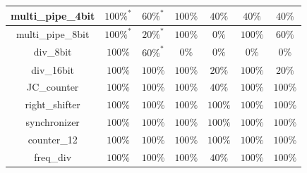\begin{tabular}{c|cc|cc|cc}
multi\_pipe\_4bit & \color{black} {\cellcolor{lightblue}} $100\%^*$ & \color{black} {\cellcolor{lightgreen}} $60\%^*$ & \color{black} {\cellcolor{lightblue}} $100\%$ & $40\%$ & $40\%$ & $40\%$ \\ \midrule
multi\_pipe\_8bit & \color{black} {\cellcolor{lightblue}} $100\%^*$ & $20\%^*$ & \color{black} {\cellcolor{lightblue}} $100\%$ & $0\%$ & \color{black} {\cellcolor{lightblue}} $100\%$ & \color{black} {\cellcolor{lightgreen}} $60\%$ \\ \midrule
div\_8bit & \color{black} {\cellcolor{lightblue}} $100\%$ & \color{black} {\cellcolor{lightgreen}} $60\%^*$ & $0\%$ & $0\%$ & $0\%$ & $0\%$ \\ \midrule
div\_16bit & \color{black} {\cellcolor{lightblue}} $100\%$ & \color{black} {\cellcolor{lightgreen}} $100\%$ & \color{black} {\cellcolor{lightblue}} $100\%$ & $20\%$ & \color{black} {\cellcolor{lightblue}} $100\%$ & $20\%$ \\ \midrule
JC\_counter & \color{black} {\cellcolor{lightblue}} $100\%$ & \color{black} {\cellcolor{lightgreen}} $100\%$ & \color{black} {\cellcolor{lightblue}} $100\%$ & $40\%$ & \color{black} {\cellcolor{lightblue}} $100\%$ & \color{black} {\cellcolor{lightgreen}} $100\%$ \\ \midrule
right\_shifter & \color{black} {\cellcolor{lightblue}} $100\%$ & \color{black} {\cellcolor{lightgreen}} $100\%$ & \color{black} {\cellcolor{lightblue}} $100\%$ & \color{black} {\cellcolor{lightgreen}} $100\%$ & \color{black} {\cellcolor{lightblue}} $100\%$ & \color{black} {\cellcolor{lightgreen}} $100\%$ \\ \midrule
synchronizer & \color{black} {\cellcolor{lightblue}} $100\%$ & \color{black} {\cellcolor{lightgreen}} $100\%$ & \color{black} {\cellcolor{lightblue}} $100\%$ & \color{black} {\cellcolor{lightgreen}} $100\%$ & \color{black} {\cellcolor{lightblue}} $100\%$ & \color{black} {\cellcolor{lightgreen}} $100\%$ \\ \midrule
counter\_12 & \color{black} {\cellcolor{lightblue}} $100\%$ & \color{black} {\cellcolor{lightgreen}} $100\%$ & \color{black} {\cellcolor{lightblue}} $100\%$ & \color{black} {\cellcolor{lightgreen}} $100\%$ & \color{black} {\cellcolor{lightblue}} $100\%$ & \color{black} {\cellcolor{lightgreen}} $100\%$ \\ \midrule
freq\_div & \color{black} {\cellcolor{lightblue}} $100\%$ & \color{black} {\cellcolor{lightgreen}} $100\%$ & \color{black} {\cellcolor{lightblue}} $100\%$ & $40\%$ & \color{black} {\cellcolor{lightblue}} $100\%$ & \color{black} {\cellcolor{lightgreen}} $100\%$ \\ \midrule

\end{tabular}
